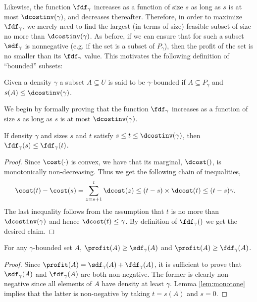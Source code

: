 Likewise, the function $\fdf_{\gamma}$ increases as a function of size
$s$ as long as $s$ is at most $\dcostinv(\gamma)$, and decreases
thereafter. Therefore, in order to maximize $\fdf_\gamma$, we merely
need to find the largest (in terms of size) feasible subset of size no
more than $\dcostinv(\gamma)$. As before, if we can ensure that for
such a subset $\sdf_\gamma$ is nonnegative (e.g. if the set is a
subset of $P_\gamma$), then the profit of the set is no smaller than
its $\fdf_{\gamma}$ value. This motivates the following definition of
``bounded'' subsets:
\begin{definition}
\label{def:bounded}
Given a density $\gamma$ a subset $A \subseteq U$ is said to be $\gamma$-bounded if $A\subseteq P_\gamma$ and $ s(A) \leq \dcostinv( \gamma)$.
\end{definition}
 
We begin by formally proving that the function $\fdf_\gamma$ increases
as a function of size $s$ as long as $s$ is at most
$\dcostinv(\gamma)$.
\begin{lemma}
  \label{lem:monotone}
  If density $\gamma$ and sizes $s$ and $t$ satisfy $s \leq t \leq \dcostinv(\gamma)$, then $ \fdf_\gamma(s)
  \leq \fdf_\gamma(t) $.
\end{lemma}

\begin{proof}
Since $\cost(\cdot)$ is convex, we have that its marginal, $\dcost()$,
is monotonically non-decreasing. Thus we get the following chain of
inequalities,
  \begin{align*}
    \cost(t) - \cost(s) &= \sum_{z=s+1}^t \dcost(z) \leq (t - s)
    \times \dcost(t) \leq (t - s) \gamma.
  \end{align*}
The last inequality follows from the assumption that $t$ is no more than $\dcostinv (\gamma) $ and hence $ \dcost(t) \leq \gamma$. By
 definition of $\fdf_\gamma()$ we get the desired claim.
\end{proof}

\begin{proposition}
\label{lem:profit-lb}
For any $\gamma$-bounded set $A$, $\profit(A)  \geq \sdf_\gamma(A)$ and  $\profit(A)  \geq \fdf_\gamma(A)$.
\end{proposition}

\begin{proof}
 Since $\profit(A) = \sdf_\gamma(A) + \fdf_\gamma(A)$, it is
 sufficient to prove that $ \sdf_\gamma(A)$ and $\fdf_\gamma(A)$ are
 both non-negative. The former is clearly non-negative since all
 elements of $A$ have density at least $\gamma$. Lemma
 \ref{lem:monotone} implies that the latter is non-negative by taking
 $t = s(A)$ and $s = 0$.
\end{proof}

